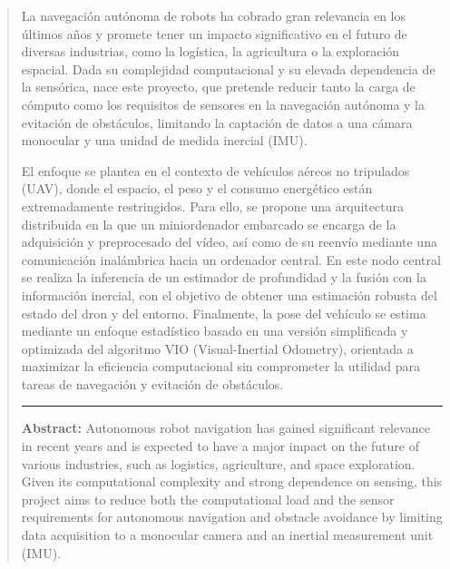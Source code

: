 \newpage %
\thispagestyle{empty}
\mbox{}

\renewcommand\abstractname{\large\bfseries\filcenter\uppercase{Resumen}}
\begin{abstract}
\thispagestyle{plain}
\setcounter{page}{3}
	
	La navegación autónoma de robots ha cobrado gran relevancia en los últimos años y promete tener un impacto significativo en el futuro de 
	diversas industrias, como la logística, la agricultura o la exploración espacial. Dada su complejidad computacional y su elevada 
	dependencia de la sensórica, nace este proyecto, que pretende reducir tanto la carga de cómputo como los requisitos de sensores en la 
	navegación autónoma y la evitación de obstáculos, limitando la captación de datos a una cámara monocular y una unidad de medida inercial 
	(IMU).

	El enfoque se plantea en el contexto de vehículos aéreos no tripulados (UAV), donde el espacio, el peso y el consumo energético están 
	extremadamente restringidos. Para ello, se propone una arquitectura distribuida en la que un miniordenador embarcado se encarga de la 
	adquisición y preprocesado del vídeo, así como de su reenvío mediante una comunicación inalámbrica hacia un ordenador central. 
	En este nodo central se realiza la inferencia de un estimador de profundidad y la fusión con la información inercial, con el objetivo 
	de obtener una estimación robusta del estado del dron y del entorno. Finalmente, la pose del vehículo se estima mediante un enfoque estadístico 
	basado en una versión simplificada y optimizada del algoritmo VIO (Visual-Inertial Odometry), 
	orientada a maximizar la eficiencia computacional sin comprometer la utilidad para tareas de navegación y evitación de obstáculos.
	

	\noindent\rule{\linewidth}{0.4pt}

	\textbf{Abstract:} Autonomous robot navigation has gained significant relevance in recent years and is expected to have a major impact on the future of 
	various industries, such as logistics, agriculture, and space exploration. Given its computational complexity and strong dependence on 
	sensing, this project aims to reduce both the computational load and the sensor requirements for autonomous navigation and obstacle 
	avoidance by limiting data acquisition to a monocular camera and an inertial measurement unit (IMU).


\end{abstract}
